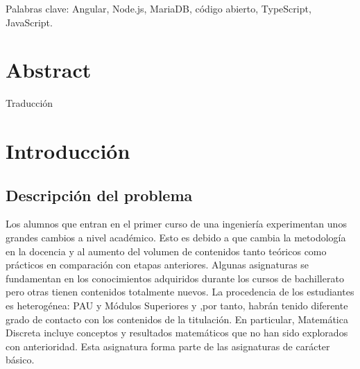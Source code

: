\documentclass[openright,twoside,10pt]{book}
\begin{document}
    Palabras clave: Angular, Node.js, MariaDB, código abierto, TypeScript,
    JavaScript.



    \chapter*{Abstract} %
    \begin{flushleft}

    Traducción

    \end{flushleft}

    \tableofcontents %

    \cleardoublepage
    \listoffigures %

    \cleardoublepage
    \listoftables %

    \chapter{Introducción}
    
    \section{Descripción del problema}\label{descripciuxf3n-del-problema}
    
    
    Los alumnos que entran en el primer curso de una ingeniería experimentan
    unos grandes cambios a nivel académico. Esto es debido a que cambia la
    metodología en la docencia y al aumento del volumen de contenidos tanto
    teóricos como prácticos en comparación con etapas anteriores. Algunas
    asignaturas se fundamentan en los conocimientos adquiridos durante los
    cursos de bachillerato pero otras tienen contenidos totalmente nuevos.
    La procedencia de los estudiantes es heterogénea: PAU y Módulos
    Superiores y ,por tanto, habrán tenido diferente grado de contacto con
    los contenidos de la titulación. En particular, Matemática Discreta
    incluye conceptos y resultados matemáticos que no han sido explorados
    con anterioridad. Esta asignatura forma parte de las asignaturas de
    carácter básico.
    
\end{document}
